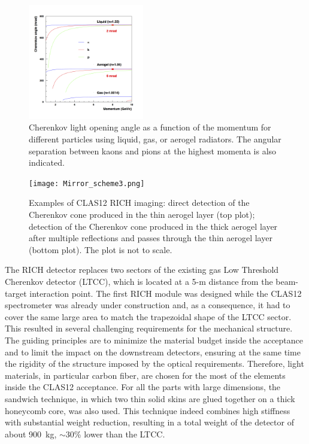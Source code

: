 \documentclass[5p,times,twocolumn]{elsarticle}
\begin{document}
\begin{figure}
\begin{center}
\includegraphics[width=0.45\textwidth]{radiators2.png}
\caption{Cherenkov light opening angle as a function of the momentum for different particles using liquid, gas, or
  aerogel radiators. The angular separation between kaons and pions at the highest momenta is also indicated.}
\label{Fig:Radiators}
\end{center}
\end{figure}

\begin{figure}
\begin{center}
\texttt{[image: Mirror\_scheme3.png]}
\caption{Examples of CLAS12 RICH imaging: direct detection of the Cherenkov cone produced in the thin aerogel layer
  (top plot); detection of the Cherenkov cone produced in the thick aerogel layer after multiple reflections and passes
  through the thin aerogel layer (bottom plot). The plot is not to scale.}
\label{Fig:RICHsketch}
\end{center}
\end{figure}


The RICH detector replaces two sectors of the existing gas Low Threshold Cherenkov detector (LTCC), which is located
at a 5-m distance from the beam-target interaction point. The first RICH module was designed while the CLAS12 spectrometer was
already under construction and,  as a consequence, it had to cover the same large area to match the trapezoidal shape of
the LTCC sector. This resulted in several challenging requirements for the mechanical structure. The guiding principles
are to minimize the material budget inside the acceptance and to limit the impact on the downstream detectors,
ensuring at the same time the rigidity of the structure imposed by the optical requirements. Therefore, light materials,
in particular carbon fiber, are chosen for the most of the elements inside the CLAS12 acceptance. For all the parts with
large dimensions, the sandwich technique, in which two thin solid skins are glued together on a thick honeycomb core, was
also used. This technique indeed combines high stiffness with substantial weight reduction, resulting in a total weight of
the detector of about 900~kg, $\sim$30\% lower than the LTCC.
\end{document}
